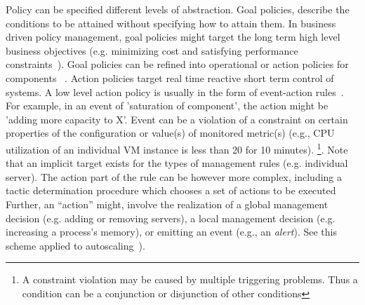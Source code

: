 Policy can be specified different levels of abstraction.
% 
Goal policies, describe the conditions to be attained without specifying how to attain them. In business driven policy management, goal policies might target the long term high level business objectives (e.g. minimizing cost and satisfying performance constraints~\cite{Sauve2005}). 
Goal policies  can be refined into operational or action policies for components ~\cite{beigi-policy-transformation,linying-automated}. 
Action policies target real time reactive short term control of systems. 
A low level action policy is usually in the form of event-action rules~\cite{desertot_autonomic_2005,chieu2009dynamic,zhang2010integrating}. 
For example, in an event of 'saturation of component', the action might be 'adding more capacity to X'. 
Event can be a violation of a constraint on certain properties of the configuration or value(s) of monitored metric(s)
(e.g., CPU utilization of an individual VM instance is less than 20 for 10 minutes).
\footnote{A constraint violation may be caused by multiple triggering problems. Thus a condition can be a conjunction or disjunction of other conditions}. 
Note that an implicit target exists for the types of  management rules (e.g. individual server). 
The action part of the rule can be however more complex, including a tactic determination procedure which 
chooses a set of actions to be executed %
Further, an ``action'' might, involve the realization of a global management decision (e.g. adding or removing servers), a local management decision  (e.g. increasing a process's memory), or emitting an event (e.g.,  an {\it alert}). 
See this scheme applied to autoscaling~\cite{rightscale_autoscaling,moreno-elastic-2009}).

